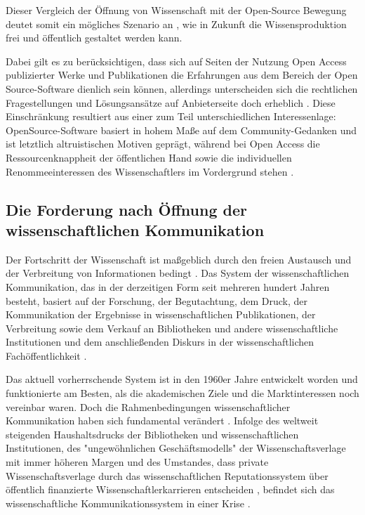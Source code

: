 Dieser Vergleich der Öffnung von Wissenschaft mit der Open-Source Bewegung deutet somit ein mögliches Szenario an \cite{Kuhlen_2002_universalaccess}, wie in Zukunft die Wissensproduktion frei und öffentlich gestaltet werden kann.

Dabei gilt es zu berücksichtigen, dass sich auf Seiten der Nutzung Open Access publizierter Werke und Publikationen die Erfahrungen aus dem Bereich der Open Source-Software dienlich sein können, allerdings unterscheiden sich die rechtlichen Fragestellungen und Lösungsansätze auf Anbieterseite  doch erheblich \cite{dorschel_2006_open}. Diese Einschränkung resultiert aus einer zum Teil unterschiedlichen Interessenlage: OpenSource-Software basiert in hohem Maße auf dem Community-Gedanken und ist letztlich altruistischen Motiven geprägt, während bei Open Access die Ressourcenknappheit der öffentlichen Hand sowie die individuellen Renommeeinteressen des Wissenschaftlers im Vordergrund stehen \cite{dorschel_2006_open}.

\subsection{Die Forderung nach Öffnung der wissenschaftlichen Kommunikation}

Der Fortschritt der Wissenschaft ist maßgeblich durch den freien Austausch und der Verbreitung von Informationen bedingt \cite{cite:11}. Das System der wissenschaftlichen Kommunikation, das in der derzeitigen Form seit mehreren hundert Jahren besteht, basiert auf der Forschung, der Begutachtung, dem Druck, der Kommunikation der Ergebnisse in wissenschaftlichen Publikationen, der Verbreitung sowie dem Verkauf an Bibliotheken und andere wissenschaftliche Institutionen \cite{cite:11a} und dem anschließenden Diskurs in der wissenschaftlichen Fachöffentlichkeit \cite{suchen}.

Das aktuell vorherrschende System ist in den 1960er Jahre entwickelt worden und funktionierte am Besten, als die akademischen Ziele und die Marktinteressen noch vereinbar waren. Doch die Rahmenbedingungen wissenschaftlicher Kommunikation haben sich fundamental verändert \cite{epaa_Weiner_2001}. Infolge des weltweit steigenden Haushaltsdrucks der Bibliotheken und wissenschaftlichen Institutionen, des "ungewöhnlichen Geschäftsmodells" \cite{cite:12} der Wissenschaftsverlage mit immer höheren Margen \cite{albert_2006_open_implications} und des Umstandes, dass private Wissenschaftsverlage durch das wissenschaftlichen Reputationssystem über öffentlich finanzierte Wissenschaftlerkarrieren entscheiden \cite{heise_2012}, befindet sich das wissenschaftliche Kommunikationssystem in einer Krise \cite{cite:14}.


